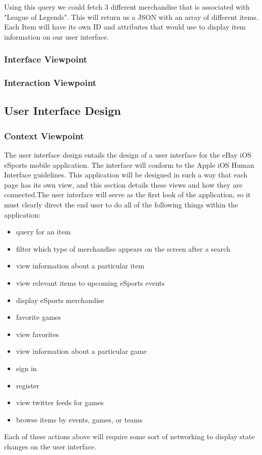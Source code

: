 \documentclass[onecolumn, draftclsnofoot,10pt, compsoc]{IEEEtran}
\begin{document}
\noindent Using this query we could fetch 3 different merchandise that is associated with "League of Legends". This will return us a JSON with an array of different items. Each Item will have its own ID and attributes that would use to display item information on our user interface.
\subsubsection{Interface Viewpoint}

\subsubsection{Interaction Viewpoint}

\subsection{User Interface Design}
\subsubsection{Context Viewpoint}
    The user interface design entails the design of a user interface for the eBay iOS eSports mobile application. The interface will conform to the Apple iOS Human Interface guidelines. This application will be designed in such a way that each page has its own view, and this section details these views and how they are connected.The user interface will serve as the first look of the application, so it must clearly direct the end user to do all of the following things within the application:
    \begin{itemize}
    \item query for an item
    \item filter which type of merchandise appears on the screen after a search 
    \item view information about a particular item 
    \item view relevant items to upcoming eSports events
    \item display eSports merchandise
    \item favorite games
    \item view favorites
    \item view information about a particular game 
    \item sign in
    \item register 
    \item view twitter feeds for games
    \item browse items by events, games, or teams
     \end{itemize}
    Each of these actions above will require some sort of networking to display state changes on the user interface.
      
\end{document}
